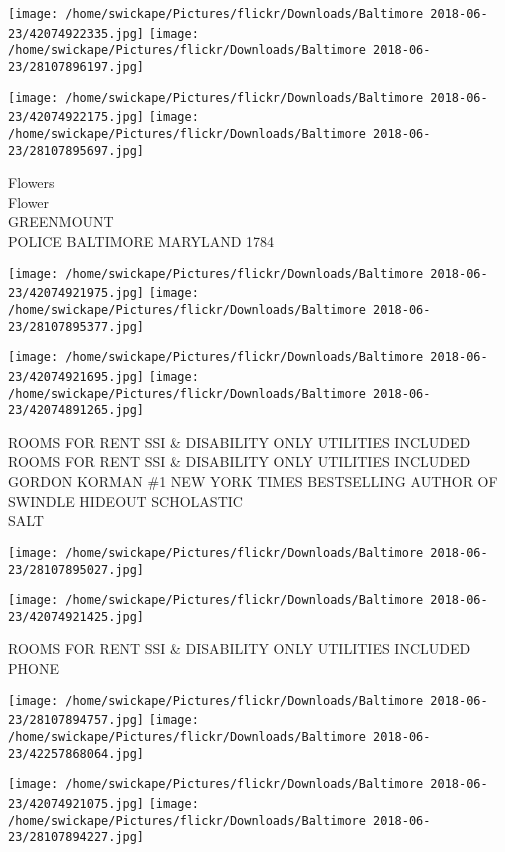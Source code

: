 \documentclass[10pt,letterpaper]{article}
\begin{document}
\texttt{[image: /home/swickape/Pictures/flickr/Downloads/Baltimore 2018-06-23/42074922335.jpg]}
\texttt{[image: /home/swickape/Pictures/flickr/Downloads/Baltimore 2018-06-23/28107896197.jpg]}

\texttt{[image: /home/swickape/Pictures/flickr/Downloads/Baltimore 2018-06-23/42074922175.jpg]}
\texttt{[image: /home/swickape/Pictures/flickr/Downloads/Baltimore 2018-06-23/28107895697.jpg]}

Flowers\\
Flower\\
GREENMOUNT\\
POLICE BALTIMORE MARYLAND 1784\\
\pagebreak

\texttt{[image: /home/swickape/Pictures/flickr/Downloads/Baltimore 2018-06-23/42074921975.jpg]}
\texttt{[image: /home/swickape/Pictures/flickr/Downloads/Baltimore 2018-06-23/28107895377.jpg]}

\texttt{[image: /home/swickape/Pictures/flickr/Downloads/Baltimore 2018-06-23/42074921695.jpg]}
\texttt{[image: /home/swickape/Pictures/flickr/Downloads/Baltimore 2018-06-23/42074891265.jpg]}

ROOMS FOR RENT SSI \& DISABILITY ONLY UTILITIES INCLUDED\\
ROOMS FOR RENT SSI \& DISABILITY ONLY UTILITIES INCLUDED\\
GORDON KORMAN \#1 NEW YORK TIMES BESTSELLING AUTHOR OF SWINDLE HIDEOUT SCHOLASTIC\\
SALT\\
\pagebreak

\texttt{[image: /home/swickape/Pictures/flickr/Downloads/Baltimore 2018-06-23/28107895027.jpg]}

\vspace{0.25in}
\texttt{[image: /home/swickape/Pictures/flickr/Downloads/Baltimore 2018-06-23/42074921425.jpg]}

ROOMS FOR RENT SSI \& DISABILITY ONLY UTILITIES INCLUDED\\
PHONE\\
\pagebreak

\texttt{[image: /home/swickape/Pictures/flickr/Downloads/Baltimore 2018-06-23/28107894757.jpg]}
\texttt{[image: /home/swickape/Pictures/flickr/Downloads/Baltimore 2018-06-23/42257868064.jpg]}

\texttt{[image: /home/swickape/Pictures/flickr/Downloads/Baltimore 2018-06-23/42074921075.jpg]}
\texttt{[image: /home/swickape/Pictures/flickr/Downloads/Baltimore 2018-06-23/28107894227.jpg]}
\end{document}
